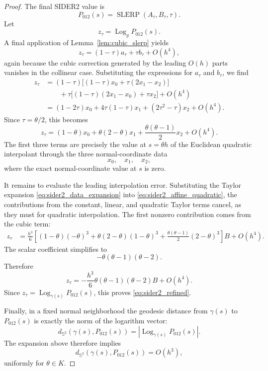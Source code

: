 \documentclass[10pt,a4paper]{amsart}
\newcommand{\Log}{\operatorname{Log}}
\newcommand{\SLERP}{\operatorname{SLERP}}
\newcommand{\bS}{\mathbb{S}}
\begin{document}
\begin{proof}
The final SIDER2 value is
\[
        P_{012}(s)=\SLERP(A_\tau,B_\tau,\tau).
\]
Let
\[
        z_\tau=\Log_y P_{012}(s).
\]
A final application of Lemma~\ref{lem:cubic_slerp} yields
\[
        z_\tau
        =
        (1-\tau)a_\tau+\tau b_\tau+O(h^4),
\]
again because the cubic correction generated by the leading \(O(h)\) parts
vanishes in the collinear case.  Substituting the expressions for \(a_\tau\)
and \(b_\tau\), we find
\begin{align*}
        z_\tau
        &=
        (1-\tau)\bigl[(1-\tau)x_0+\tau(2x_1-x_2)\bigr]  \\
        &\qquad
        +\tau\bigl[(1-\tau)(2x_1-x_0)+\tau x_2\bigr]
        +O(h^4)                                                   \\
        &=
        (1-2\tau)x_0
        +
        4\tau(1-\tau)x_1
        +
        (2\tau^2-\tau)x_2
        +O(h^4).
\end{align*}
Since \(\tau=\theta/2\), this becomes
\begin{equation}
\label{eq:sider2_affine_quadratic}
        z_\tau
        =
        (1-\theta)x_0
        +
        \theta(2-\theta)x_1
        +
        \frac{\theta(\theta-1)}{2}x_2
        +O(h^4).
\end{equation}
The first three terms are precisely the value at \(s=\theta h\) of the
Euclidean quadratic interpolant through the three normal-coordinate data
\[
        x_0,\quad x_1,\quad x_2,
\]
where the exact normal-coordinate value at \(s\) is zero.

It remains to evaluate the leading interpolation error.  Substituting the
Taylor expansion \eqref{eq:sider2_data_expansion} into
\eqref{eq:sider2_affine_quadratic}, the contributions from the constant,
linear, and quadratic Taylor terms cancel, as they must for quadratic
interpolation.  The first nonzero contribution comes from the cubic term:
\[
\begin{aligned}
        z_\tau
        &=
        \frac{h^3}{6}
        \left[
        (1-\theta)(-\theta)^3
        +
        \theta(2-\theta)(1-\theta)^3
        +
        \frac{\theta(\theta-1)}{2}(2-\theta)^3
        \right]B
        +O(h^4).
\end{aligned}
\]
The scalar coefficient simplifies to
\[
        -\theta(\theta-1)(\theta-2).
\]
Therefore
\[
        z_\tau
        =
        -\frac{h^3}{6}
        \theta(\theta-1)(\theta-2)B
        +O(h^4).
\]
Since \(z_\tau=\Log_{\gamma(s)}P_{012}(s)\), this proves
\eqref{eq:sider2_refined}.

Finally, in a fixed normal neighborhood the geodesic distance from
\(\gamma(s)\) to \(P_{012}(s)\) is exactly the norm of the logarithm vector:
\[
        d_{\bS^2}(\gamma(s),P_{012}(s))
        =
        \left|\Log_{\gamma(s)}P_{012}(s)\right|.
\]
The expansion above therefore implies
\[
        d_{\bS^2}(\gamma(s),P_{012}(s))=O(h^3),
\]
uniformly for \(\theta\in K\).
\end{proof}
\end{document}
